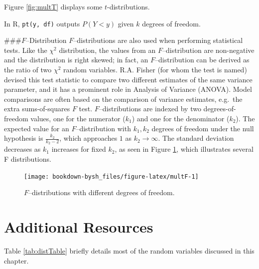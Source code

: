 \documentclass[
]{krantz}
\begin{document}
Figure \ref{fig:multT} displays some \(t\)-distributions.

In R, \texttt{pt(y,\ df)} outputs \(P(Y < y)\) given \(k\) degrees of freedom.

\#\#\#\(F\)--Distribution
\(F\)--distributions are also used when performing statistical tests. Like the \(\chi^2\) distribution, the values from an \(F\)--distribution are non-negative and the distribution is right skewed; in fact, an \(F\)--distribution can be derived as the ratio of two \(\chi^2\) random variables. R.A. Fisher (for whom the test is named) devised this test statistic to compare two different estimates of the same variance parameter, and it has a prominent role in Analysis of Variance (ANOVA). Model comparisons are often based on the comparison of variance estimates, e.g.~the extra sums-of-squares \(F\) test. \(F\)--distributions are indexed by two degrees-of-freedom values, one for the numerator (\(k_1\)) and one for the denominator (\(k_2\)). The expected value for an \(F\)--distribution with \(k_1, k_2\) degrees of freedom under the null hypothesis is \(\frac{k_2}{k_2 - 2}\), which approaches \(1\) as \(k_2 \rightarrow \infty\). The standard deviation decreases as \(k_1\) increases for fixed \(k_2\), as seen in Figure \ref{fig:multF}, which illustrates several F distributions.



\begin{figure}

{\centering \texttt{[image: bookdown-bysh\_files/figure-latex/multF-1]} 

}

\caption{\(F\)--distributions with different degrees of freedom.}\label{fig:multF}
\end{figure}

\hypertarget{additional-resources}{%
\section{Additional Resources}\label{additional-resources}}

Table \ref{tab:distTable} briefly details most of the random variables discussed in this chapter.
\end{document}
